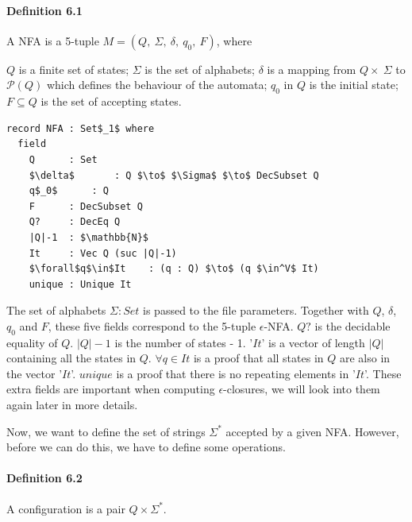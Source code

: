 \documentclass[twoside,openright,final]{bhamthesis}
\renewcommand{\item}{\itemindent0.5cm\itemold}
\begin{document}
\paragraph{Definition 6.1} A NFA is a 5-tuple \(M = (Q
,\ \Sigma,\ \delta,\ q_0,\ F)\), where
\begin{enumerate}[nolistsep]
  \item \(Q\) is a finite set of states;
  \item \(\Sigma\) is the set of alphabets;
  \item \(\delta\) is a mapping from \(Q \times\ \Sigma\) to
    \(\mathcal P \left({Q}\right)\) which defines the behaviour of the automata;
  \item \(q_0\) in \(Q\) is the initial state;
  \item \(F \subseteq Q\) is the set of accepting states. 
\end{enumerate}
\begin{lstlisting}[caption=NFA,mathescape=true]
record NFA : Set$_1$ where
  field
    Q      : Set
    $\delta$       : Q $\to$ $\Sigma$ $\to$ DecSubset Q
    q$_0$      : Q
    F      : DecSubset Q
    Q?     : DecEq Q
    |Q|-1  : $\mathbb{N}$
    It     : Vec Q (suc |Q|-1)
    $\forall$q$\in$It    : (q : Q) $\to$ (q $\in^V$ It)
    unique : Unique It
\end{lstlisting}
\vspace{1pc}
\par The set of alphabets \(\Sigma : Set\) is passed to the file
parameters. Together with \(Q\), \(\delta\),
\(q_0\) and \(F\), these five fields correspond to the 5-tuple
\(\epsilon\)-NFA. \(Q?\) is
the decidable equality of \(Q\). \(|Q|-1\) is the number of states -
1. '\(It\)' is a vector of length \(|Q|\) containing all the
states in \(Q\). \(\forall q\in It\) is a
proof that all states in \(Q\) are also in the vector
'\(It\)'. \(unique\) is a proof that there is no repeating elements in
'\(It\)'. These extra fields are important when computing
\(\epsilon\)-closures, we will look into them again later in more
details.  

\par Now, we want to define the set of strings \(\Sigma^*\) accepted by a given
NFA. However, before we can do this, we have to define
some operations.

\paragraph{Definition 6.2} A configuration is a pair \(Q \times
\Sigma^*\). 
\end{document}
